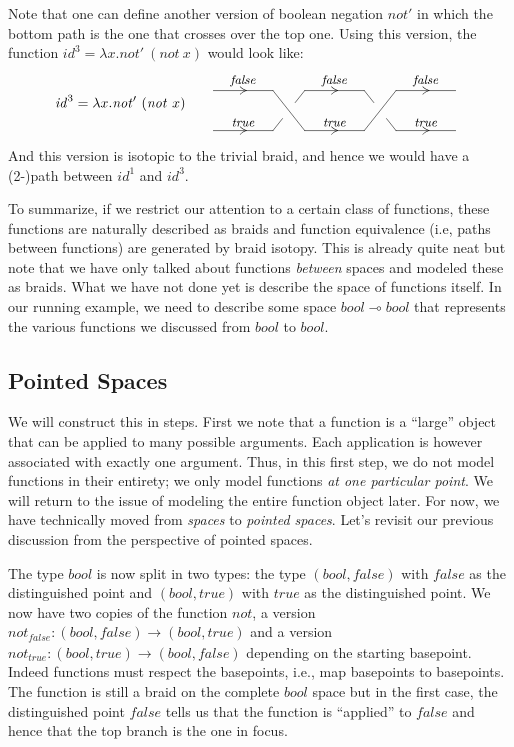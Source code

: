 \documentclass[11pt]{article}
\makeatletter
\def\wirechart#1#2{\let\labelstyle\objectstyle\xy*[*1.0]\xybox{\small%
\xymatrix@C=10mm@R=4mm#1{#2}}\endxy}
\def\wire#1#2{\ar@{-}[#1]^<>(.5){#2}}
\def\wireright#1#2{\wire{#1}{#2}\ar@{}[#1]|<>(.5)/.6ex/{\dir2{>}}}
\def\wwblank#1{*=<#1,0mm>{~}}
\def\blank{\wwblank{8mm}}
\def\wirecross#1{\save[]!L;[#1]!R**@{-}\restore}
\def\wirebraid#1#2{\save[]!L;[#1]!R**{}?(#2)**@{-}\restore\save[#1]!R;[]!L**{}?(#2)**@{-}\restore}
\newcommand{\lolli}{\multimap}
\newcommand{\boolt}{\mathit{bool}}
\newcommand{\ffv}{\mathit{false}}
\newcommand{\ttv}{\mathit{true}}
\newcommand{\notb}{\mathit{not}}
\newcommand{\idc}{\mathit{id}}
\makeatother
\begin{document}
Note that one can define another version of boolean negation $\notb'$ in
which the bottom path is the one that crosses over the top one. Using this
version, the function $\idc^3 = \lambda x.\notb'~(\notb~x)$ would look like:
\[
\idc^3 = \lambda x.\notb'~(\notb~x) \qquad
\vcenter{\wirechart{@C=1.5cm@R=0.8cm}{
     *{}\wireright{r}{\ffv}&
     \blank\wirecross{d}\wireright{r}{\ffv}&
     \blank\wirebraid{d}{.3}\wireright{r}{\ffv}&
     \\
     *{}\wireright{r}{\ttv}&
     \blank\wirebraid{u}{.3}\wireright{r}{\ttv}&
     \blank\wirecross{u}\wireright{r}{\ttv}&
     \\
     }}
\]
And this version is isotopic to the trivial braid, and hence we would have a
(2-)path between $\idc^1$ and $\idc^3$.

To summarize, if we restrict our attention to a certain class of functions,
these functions are naturally described as braids and function equivalence
(i.e, paths between functions) are generated by braid isotopy. This is
already quite neat but note that we have only talked about functions
\emph{between} spaces and modeled these as braids. What we have not done yet
is describe the space of functions itself. In our running example, we need to
describe some space $\boolt \lolli \boolt$ that represents the various
functions we discussed from $\boolt$ to $\boolt$.

\subsection{Pointed Spaces} 

We will construct this in steps. First we note that a function is a ``large''
object that can be applied to many possible arguments. Each application is
however associated with exactly one argument. Thus, in this first step, we do
not model functions in their entirety; we only model functions \emph{at one
  particular point}. We will return to the issue of modeling the entire
function object later. For now, we have technically moved from \emph{spaces}
to \emph{pointed spaces}. Let's revisit our previous discussion from the
perspective of pointed spaces.

The type $\boolt$ is now split in two types: the type $(\boolt,\ffv)$ with
$\ffv$ as the distinguished point and $(\boolt,\ttv)$ with $\ttv$ as the
distinguished point. We now have two copies of the function $\notb$, a
version $\notb_{\ffv} : (\boolt,\ffv) \rightarrow (\boolt,\ttv)$ and a
version $\notb_{\ttv} : (\boolt,\ttv) \rightarrow (\boolt,\ffv)$ depending on
the starting basepoint. Indeed functions must respect the basepoints, i.e.,
map basepoints to basepoints. The function is still a braid on the complete
$\boolt$ space but in the first case, the distinguished point $\ffv$ tells us
that the function is ``applied'' to $\ffv$ and hence that the top branch is
the one in focus.
\end{document}

